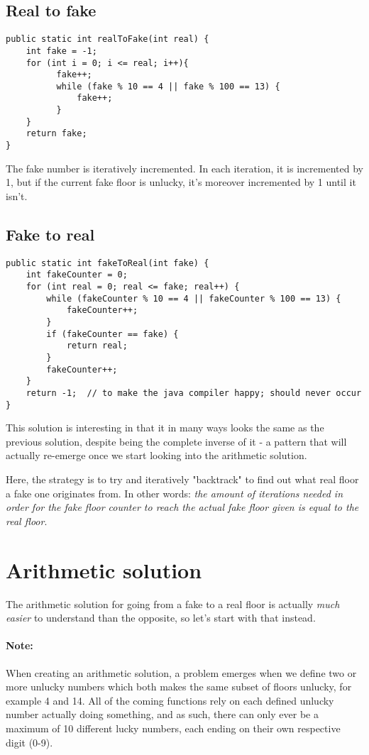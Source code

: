 \documentclass{article}
\begin{document}
\subsection{Real to fake}
\begin{lstlisting}
public static int realToFake(int real) {
    int fake = -1;
    for (int i = 0; i <= real; i++){
          fake++;
          while (fake % 10 == 4 || fake % 100 == 13) {
              fake++;
          }
    }
    return fake;    
}
\end{lstlisting}
The fake number is iteratively incremented. In each iteration, it is incremented by 1, but if the current fake floor is unlucky, it's moreover incremented by 1 until it isn't.

\subsection{Fake to real}
\begin{lstlisting}
public static int fakeToReal(int fake) {
    int fakeCounter = 0;
    for (int real = 0; real <= fake; real++) {
        while (fakeCounter % 10 == 4 || fakeCounter % 100 == 13) {
            fakeCounter++;
        }
        if (fakeCounter == fake) {
            return real;
        }
        fakeCounter++;
    }  
    return -1;  // to make the java compiler happy; should never occur
}
\end{lstlisting}
This solution is interesting in that it in many ways looks the same as the previous solution, despite being the complete inverse of it - a pattern that will actually re-emerge once we start looking into the arithmetic solution. 

Here, the strategy is to try and iteratively "backtrack" to find out what real floor a fake one originates from. In other words: \textit{the amount of iterations needed in order for the fake floor counter to reach the actual fake floor given is equal to the real floor}.

\section{Arithmetic solution}
The arithmetic solution for going from a fake to a real floor is actually \textit{much easier} to understand than the opposite, so let's start with that instead.

\paragraph{Note:} When creating an arithmetic solution, a problem emerges when we define two or more unlucky numbers which both makes the same subset of floors unlucky, for example 4 and 14. All of the coming functions rely on each defined unlucky number actually doing something, and as such, there can only ever be a maximum of 10 different lucky numbers, each ending on their own respective digit (0-9). 
\end{document}
